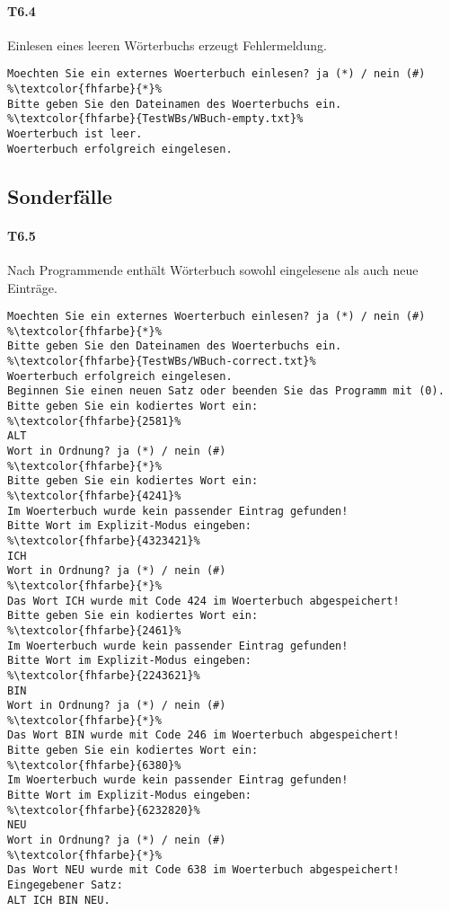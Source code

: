 \paragraph*{T6.4} Einlesen eines leeren Wörterbuchs erzeugt Fehlermeldung.
\begin{lstlisting}[escapechar=\%]
Moechten Sie ein externes Woerterbuch einlesen? ja (*) / nein (#)
%\textcolor{fhfarbe}{*}%
Bitte geben Sie den Dateinamen des Woerterbuchs ein.
%\textcolor{fhfarbe}{TestWBs/WBuch-empty.txt}%
Woerterbuch ist leer.
Woerterbuch erfolgreich eingelesen.
\end{lstlisting}


\subsection*{Sonderfälle}\label{subsec:wbuch-sonderfaelle}
\paragraph*{T6.5} Nach Programmende enthält Wörterbuch sowohl eingelesene als auch neue Einträge.
\begin{lstlisting}[escapechar=\%]
Moechten Sie ein externes Woerterbuch einlesen? ja (*) / nein (#)
%\textcolor{fhfarbe}{*}%
Bitte geben Sie den Dateinamen des Woerterbuchs ein.
%\textcolor{fhfarbe}{TestWBs/WBuch-correct.txt}%
Woerterbuch erfolgreich eingelesen.
Beginnen Sie einen neuen Satz oder beenden Sie das Programm mit (0).
Bitte geben Sie ein kodiertes Wort ein:
%\textcolor{fhfarbe}{2581}%
ALT
Wort in Ordnung? ja (*) / nein (#)
%\textcolor{fhfarbe}{*}%
Bitte geben Sie ein kodiertes Wort ein:
%\textcolor{fhfarbe}{4241}%
Im Woerterbuch wurde kein passender Eintrag gefunden!
Bitte Wort im Explizit-Modus eingeben:
%\textcolor{fhfarbe}{4323421}%
ICH
Wort in Ordnung? ja (*) / nein (#)
%\textcolor{fhfarbe}{*}%
Das Wort ICH wurde mit Code 424 im Woerterbuch abgespeichert!
Bitte geben Sie ein kodiertes Wort ein:
%\textcolor{fhfarbe}{2461}%
Im Woerterbuch wurde kein passender Eintrag gefunden!
Bitte Wort im Explizit-Modus eingeben:
%\textcolor{fhfarbe}{2243621}%
BIN
Wort in Ordnung? ja (*) / nein (#)
%\textcolor{fhfarbe}{*}%
Das Wort BIN wurde mit Code 246 im Woerterbuch abgespeichert!
Bitte geben Sie ein kodiertes Wort ein:
%\textcolor{fhfarbe}{6380}%
Im Woerterbuch wurde kein passender Eintrag gefunden!
Bitte Wort im Explizit-Modus eingeben:
%\textcolor{fhfarbe}{6232820}%
NEU
Wort in Ordnung? ja (*) / nein (#)
%\textcolor{fhfarbe}{*}%
Das Wort NEU wurde mit Code 638 im Woerterbuch abgespeichert!
Eingegebener Satz:
ALT ICH BIN NEU.
\end{lstlisting}

